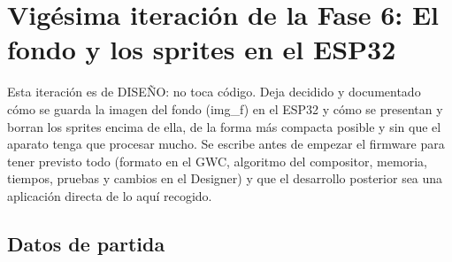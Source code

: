 \section{Vigésima iteración de la Fase 6: El fondo y los sprites en el ESP32}
\label{sec:F6I91}

Esta iteración es de DISEÑO: no toca código. Deja decidido y documentado cómo se guarda la imagen del fondo (img\_f) en el ESP32 y cómo se presentan y borran los sprites encima de ella, de la forma más compacta posible y sin que el aparato tenga que procesar mucho. Se escribe antes de empezar el firmware para tener previsto todo (formato en el GWC, algoritmo del compositor, memoria, tiempos, pruebas y cambios en el Designer) y que el desarrollo posterior sea una aplicación directa de lo aquí recogido.

\subsection{Datos de partida}
\label{sec:F6I91Datos}

